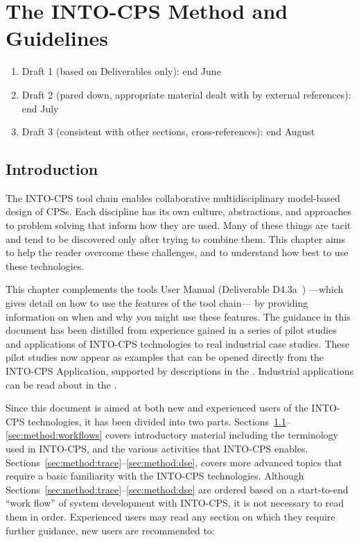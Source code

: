 \section{The INTO-CPS Method and Guidelines}\label{sec:method}

\begin{enumerate}
  \item Draft 1 (based on Deliverables only): end June
  \item Draft 2 (pared down, appropriate material dealt with by external references): end July
  \item Draft 3 (consistent with other sections, cross-references): end August
\end{enumerate}

\subsection{Introduction}
\label{sec:method:intro}

The INTO-CPS tool chain enables collaborative multidisciplinary model-based design of CPSs. Each discipline has its own culture, abstractions, and approaches to problem solving that inform how they are used. Many of these things are tacit and tend to be discovered only after trying to combine them. This chapter aims to help the reader overcome these challenges, and to understand how best to use these technologies.

This chapter complements the tools User Manual (Deliverable D4.3a~\cite{INTOCPSD4.3a}) ---which gives detail on how to use the features of the tool chain--- by providing information on when and why you might use these features. The guidance in this document has been distilled from experience gained in a series of pilot studies and applications of INTO-CPS technologies to real industrial case studies. These pilot studies now appear as examples that can be opened directly from the INTO-CPS Application, supported by descriptions in the . Industrial applications can be read about in the .

Since this document is aimed at both new and experienced users of the INTO-CPS technologies, it has been divided into two parts. Sections~\ref{sec:method:intro}--\ref{sec:method:workflows} covers introductory material including the terminology used in INTO-CPS, and the various activities that INTO-CPS enables. Sections~\ref{sec:method:trace}--\ref{sec:method:dse}, covers more advanced topics that require a basic familiarity with the INTO-CPS technologies. Although Sections~\ref{sec:method:trace}--\ref{sec:method:dse} are ordered based on a start-to-end ``work flow'' of system development with INTO-CPS, it is not necessary to read them in order. Experienced users may read any section on which they require further guidance, new users are recommended to:

